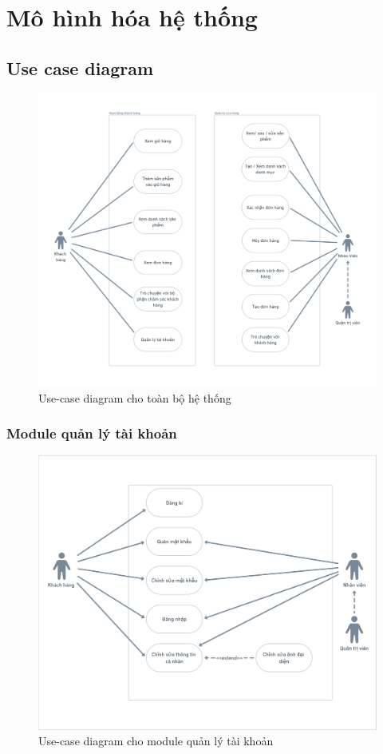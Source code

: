 \chapter{Mô hình hóa hệ thống}

\section{Use case diagram}
\begin{figure}[h]
    \centering
    \includegraphics[scale = 0.22]{img/use-case.png}
    \caption{Use-case diagram cho toàn bộ hệ thống}
    \label{fig:taskAssignment}
\end{figure}
\newpage
\subsection{Module quản lý tài khoản}
\begin{figure}[h]
    \centering
    \includegraphics[scale = 0.2]{img/mod/tk-mod.png}
    \vspace{1cm}
    \caption{Use-case diagram cho module quản lý tài khoản}
    \label{fig:taskAssignment}
\end{figure}

